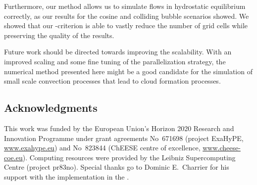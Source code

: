 \documentclass[runningheads]{llncs}
\begin{document}
Furthermore, our method allows us to simulate flows in hydrostatic equilibrium correctly, as our results for the cosine and colliding bubble scenarios showed.
We showed that our \amr{}-criterion is able to vastly reduce the number of grid cells while preserving the quality of the results.

Future work should be directed towards improving the scalability.
With an improved \amr{} scaling and some fine tuning of the parallelization strategy, the numerical method presented here might be a good candidate for the simulation of small scale convection processes that lead to cloud formation processes.

\subsection*{Acknowledgments}
This work was funded by the European Union’s Horizon 2020 Research and Innovation Programme under grant agreements 
No~671698 (project ExaHyPE, \url{www.exahype.eu}) and 
No~823844 (ChEESE centre of excellence, \url{www.cheese-coe.eu}).
Computing resources were provided by the Leibniz Supercomputing Centre (project pr83no).
Special thanks go to Dominic E.\ Charrier for his support with the implementation in the \exahypeengine{}.


{}
\end{document}
